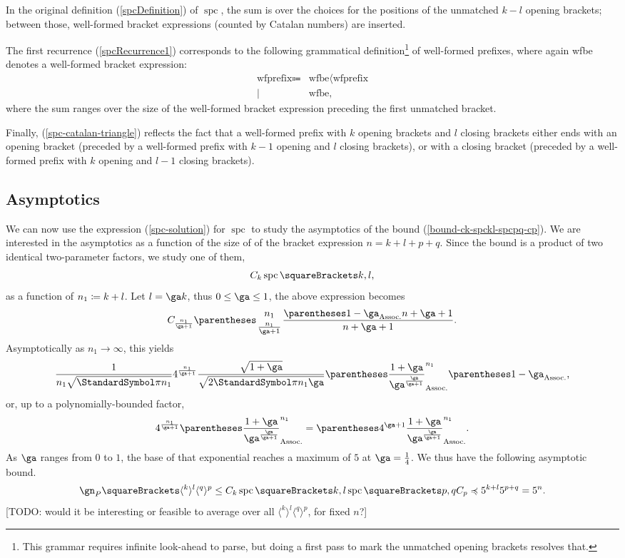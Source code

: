 \documentclass[10pt, a4paper, twoside]{basestyle}
\DeclareMathOperator{\spc}{spc}
\begin{document}
In the original definition (\ref{spcDefinition}) of $\spc$, the sum is over the choices for the positions of the
unmatched $k-l$ opening brackets; between those, well-formed bracket expressions (counted by Catalan numbers) are
inserted.

The first recurrence (\ref{spcRecurrence1}) corresponds to the following grammatical
definition\footnote{This grammar requires infinite look-ahead to parse, but doing a first pass to mark the
unmatched opening brackets resolves that.} of well-formed
prefixes, where again wfbe denotes a well-formed bracket expression:
\begin{align*}
\text{wfprefix} \Coloneq
& \text{wfbe} \langle \text{wfprefix} \\
\mid\: & \text{wfbe},
\end{align*}
where the sum ranges over the size of the well-formed bracket expression preceding the first unmatched bracket.

Finally, (\ref{spc-catalan-triangle}) reflects the fact that a well-formed prefix with $k$ opening brackets
and $l$ closing brackets either ends with an opening bracket (preceded by a well-formed prefix with $k-1$ opening
and $l$ closing brackets), or with a closing bracket (preceded by a well-formed prefix with $k$ opening
and $l-1$ closing brackets).
\subsection{Asymptotics}
We can now use the expression (\ref{spc-solution}) for $\spc$ to study the asymptotics of the bound
(\ref{bound-ck-spckl-spcpq-cp}).
We are interested in the asymptotics as a function of the size of of the bracket expression $n = k+l+p+q$.
Since the bound is a product of two identical two-parameter factors, we study one of them,\[
C_k\spc\of{k,l}\text,
\]
as a function of $n_1\coloneq k+l$. Let $l = \ga k$, thus $0\leq \ga\leq 1$,
the above expression becomes \[
C_{\frac{n_1}{\ga + 1}} \binom{n_1}{\frac{n_1}{\ga + 1}} \frac{\pa{1-\ga}n+\ga+1}{n+\ga+1}\text.
\]
Asymptotically as $n_1\longrightarrow \infty$, this yields\[
\frac
  {1}
  {n_1\sqrt{\Pi n_1}}
4^{\frac{n_1}{\ga + 1}}
\frac
  {\sqrt{1+\ga}}
  {\sqrt{2\Pi n_1 \ga}}
\pa{
  \frac
    {1+\ga}
    {\ga^{\frac{\ga}{\ga + 1}}}}^{n_1}
\pa{1-\ga}\text,
\]
or, up to a polynomially-bounded factor,\[
4^{\frac{n_1}{\ga + 1}}
\pa{
  \frac
    {1+\ga}
    {\ga^{\frac{\ga}{\ga + 1}}}}^{n_1}
=
\pa{
4^{\ga + 1}
\frac
  {1+\ga}
  {\ga^{\frac{\ga}{\ga + 1}}}}^{n_1}\text.
\]
As $\ga$ ranges from $0$ to $1$, the base of that exponential reaches a maximum of $5$ at
$\ga=\frac 1 4$. We thus have the following asymptotic bound.\begin{equation}
\gn_P\of{\langle^k\rangle^l\langle^q\rangle^p}\leq
C_k\spc\of{k, l}\spc\of{p, q}C_p
\preccurlyeq
5^{k+l}5^{p+q} = 5^n
\text.
\end{equation}
[TODO: would it be interesting or feasible to average over all $\langle^k\rangle^l\langle^q\rangle^p$,
for fixed $n$?]
\clearpage
\nocite{*}


\end{document}

